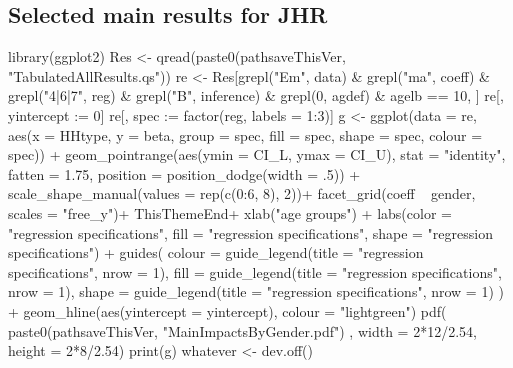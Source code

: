 \clearpage
\subsection{Selected main results for JHR}

\begin{Schunk}
\begin{Sinput}
library(ggplot2)
Res <- qread(paste0(pathsaveThisVer, "TabulatedAllResults.qs"))
re <- Res[grepl("Em", data) & grepl("ma", coeff) & grepl("4|6|7", reg) & grepl("B", inference)
   & grepl(0, agdef) & agelb == 10, ]
re[, yintercept := 0]
re[, spec := factor(reg, labels = 1:3)]
g <- 
ggplot(data = re, 
    aes(x = HHtype, y = beta, group = spec, fill = spec, shape = spec, colour = spec)) + 
  geom_pointrange(aes(ymin = CI_L, ymax = CI_U),
    stat = "identity", fatten = 1.75, 
    position = position_dodge(width = .5)) +
  scale_shape_manual(values = rep(c(0:6, 8), 2))+
  facet_grid(coeff ~ gender, scales = "free_y")+
  ThisThemeEnd+
  xlab("age groups") + 
  labs(color  = "regression specifications", fill = "regression specifications", 
    shape = "regression specifications") +
  guides(
    colour = guide_legend(title = "regression specifications", nrow = 1),
    fill = guide_legend(title = "regression specifications", nrow = 1),
    shape = guide_legend(title = "regression specifications", nrow = 1)
    ) +
  geom_hline(aes(yintercept = yintercept), colour = "lightgreen")
pdf(
  paste0(pathsaveThisVer, "MainImpactsByGender.pdf")
  , width = 2*12/2.54, height = 2*8/2.54)
print(g)
whatever <- dev.off()
\end{Sinput}
\end{Schunk}


